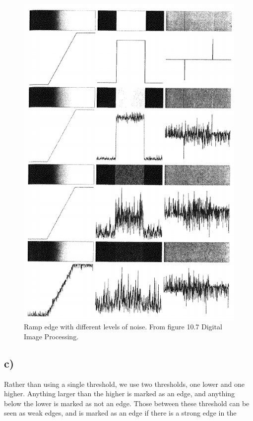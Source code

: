 \begin{figure}[]
    \centering
    \includegraphics[width=1.00\textwidth]{figures/noisy_edge.png}
    \caption{Ramp edge with different levels of noise. From figure 10.7 Digital Image Processing. }
    \label{fig:noisy_edge}
\end{figure}

\subsection*{c)}
Rather than using a single threshold, we use two thresholds, one lower and one higher. Anything larger than the higher is marked as an edge, and anything below the lower is marked as not an edge. Those between these threshold can be seen as weak edges, and is marked as an edge if there is a strong edge in the 

